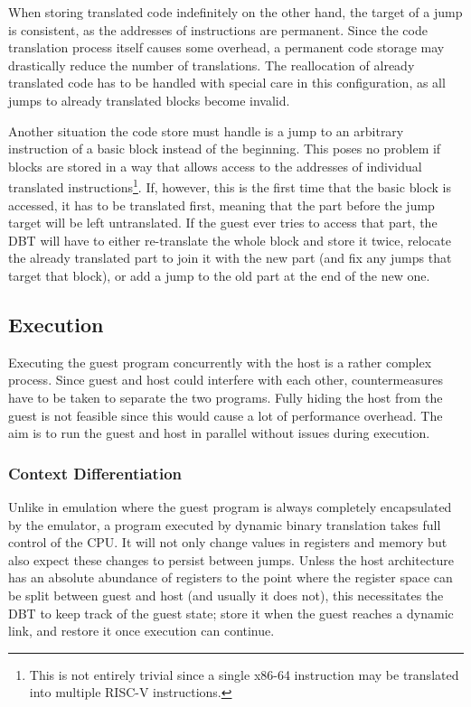 When storing translated code indefinitely on the other hand, the target of a jump is consistent, as the addresses of instructions are permanent. Since the code translation process itself causes some overhead, a permanent code storage may drastically reduce the number of translations. The reallocation of already translated code has to be handled with special care in this configuration, as all jumps to already translated blocks become invalid.

Another situation the code store must handle is a jump to an arbitrary instruction of a basic block instead of the beginning. This poses no problem if blocks are stored in a way that allows access to the addresses of individual translated instructions\footnote{This is not entirely trivial since a single x86-64 instruction may be translated into multiple RISC-V instructions.}. If, however, this is the first time that the basic block is accessed, it has to be translated first, meaning that the part before the jump target will be left untranslated. If the guest ever tries to access that part, the DBT will have to either re-translate the whole block and store it twice, relocate the already translated part to join it with the new part (and fix any jumps that target that block), or add a jump to the old part at the end of the new one.

\subsection{Execution}
Executing the guest program concurrently with the host is a rather complex process. Since guest and host could interfere with each other, countermeasures have to be taken to separate the two programs. Fully hiding the host from the guest is not feasible since this would cause a lot of performance overhead. The aim is to run the guest and host in parallel without issues during execution. 

	\subsubsection{Context Differentiation}
	\label{context}
		Unlike in emulation where the guest program is always completely encapsulated by the emulator, a program executed by dynamic binary translation takes full control of the CPU. It will not only change values in registers and memory but also expect these changes to persist between jumps. Unless the host architecture has an absolute abundance of registers to the point where the register space can be split between guest and host (and usually it does not), this necessitates the DBT to keep track of the guest state; store it when the guest reaches a dynamic link, and restore it once execution can continue.
		
